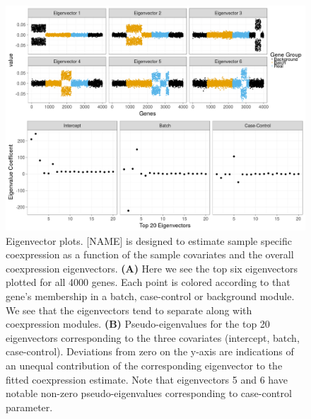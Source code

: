 \begin{figure}
\begin{center}
\includegraphics[width=1\columnwidth]{figures/EigenvectorPlots.png}
\end{center}\caption[Eigenvector plots showing separation of modular structure]{Eigenvector plots. {[}NAME{]} is designed to estimate sample specific
coexpression as a function of the sample covariates and the overall
coexpression eigenvectors. \textbf{(A)} Here we see the top six eigenvectors
plotted for all 4000 genes. Each point is colored according to that
gene's membership in a batch, case-control or background module. We
see that the eigenvectors tend to separate along with coexpression
modules. \textbf{(B)} Pseudo-eigenvalues for the top 20 eigenvectors
corresponding to the three covariates (intercept, batch, case-control).
Deviations from zero on the y-axis are indications of an unequal contribution
of the corresponding eigenvector to the fitted coexpression estimate.
Note that eigenvectors 5 and 6 have notable non-zero pseudo-eigenvalues
corresponding to case-control parameter.}
\label{fig:Eigenvector_plots}
\end{figure}
